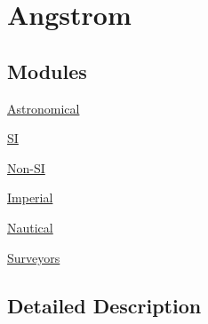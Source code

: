\hypertarget{group___e_g_x_math-_conversions-_length_conversions-_non-_s_i-_angstrom}{}\section{Angstrom}
\label{group___e_g_x_math-_conversions-_length_conversions-_non-_s_i-_angstrom}
\subsection*{Modules}
\begin{DoxyCompactItemize}
\item 
\mbox{\hyperlink{group___e_g_x_math-_conversions-_length_conversions-_non-_s_i-_angstrom-_astronomical}{Astronomical}}
\item 
\mbox{\hyperlink{group___e_g_x_math-_conversions-_length_conversions-_non-_s_i-_angstrom-_s_i}{SI}}
\item 
\mbox{\hyperlink{group___e_g_x_math-_conversions-_length_conversions-_non-_s_i-_angstrom-_non-_s_i}{Non-\/\+SI}}
\item 
\mbox{\hyperlink{group___e_g_x_math-_conversions-_length_conversions-_non-_s_i-_angstrom-_imperial}{Imperial}}
\item 
\mbox{\hyperlink{group___e_g_x_math-_conversions-_length_conversions-_non-_s_i-_angstrom-_nautical}{Nautical}}
\item 
\mbox{\hyperlink{group___e_g_x_math-_conversions-_length_conversions-_non-_s_i-_angstrom-_surveyors}{Surveyors}}
\end{DoxyCompactItemize}


\subsection{Detailed Description}

